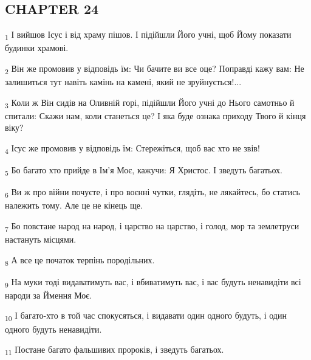 \subsection{CHAPTER 24}
\begin{tcolorbox}
\textsubscript{1} І вийшов Ісус і від храму пішов. І підійшли Його учні, щоб Йому показати будинки храмові.
\end{tcolorbox}
\begin{tcolorbox}
\textsubscript{2} Він же промовив у відповідь їм: Чи бачите ви все оце? Поправді кажу вам: Не залишиться тут навіть камінь на камені, який не зруйнується!...
\end{tcolorbox}
\begin{tcolorbox}
\textsubscript{3} Коли ж Він сидів на Оливній горі, підійшли Його учні до Нього самотньо й спитали: Скажи нам, коли станеться це? І яка буде ознака приходу Твого й кінця віку?
\end{tcolorbox}
\begin{tcolorbox}
\textsubscript{4} Ісус же промовив у відповідь їм: Стережіться, щоб вас хто не звів!
\end{tcolorbox}
\begin{tcolorbox}
\textsubscript{5} Бо багато хто прийде в Ім'я Моє, кажучи: Я Христос. І зведуть багатьох.
\end{tcolorbox}
\begin{tcolorbox}
\textsubscript{6} Ви ж про війни почуєте, і про воєнні чутки, глядіть, не лякайтесь, бо статись належить тому. Але це не кінець ще.
\end{tcolorbox}
\begin{tcolorbox}
\textsubscript{7} Бо повстане народ на народ, і царство на царство, і голод, мор та землетруси настануть місцями.
\end{tcolorbox}
\begin{tcolorbox}
\textsubscript{8} А все це початок терпінь породільних.
\end{tcolorbox}
\begin{tcolorbox}
\textsubscript{9} На муки тоді видаватимуть вас, і вбиватимуть вас, і вас будуть ненавидіти всі народи за Ймення Моє.
\end{tcolorbox}
\begin{tcolorbox}
\textsubscript{10} І багато-хто в той час спокусяться, і видавати один одного будуть, і один одного будуть ненавидіти.
\end{tcolorbox}
\begin{tcolorbox}
\textsubscript{11} Постане багато фальшивих пророків, і зведуть багатьох.
\end{tcolorbox}
